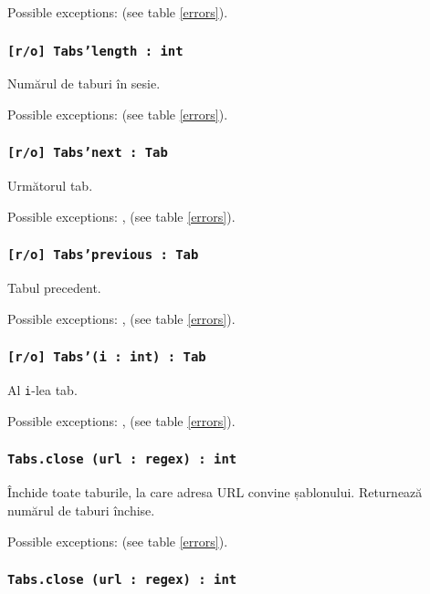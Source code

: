 Possible exceptions:  (see table \ref{errors}).

\subsubsection{\texttt{[r/o] Tabs'length : int}}

Numărul de taburi în sesie.

Possible exceptions:  (see table \ref{errors}).

\subsubsection{\texttt{[r/o] Tabs'next : Tab}}

Următorul tab.

Possible exceptions: ,  (see table \ref{errors}).

\subsubsection{\texttt{[r/o] Tabs'previous : Tab}}

Tabul precedent.

Possible exceptions: ,  (see table \ref{errors}).

\subsubsection{\texttt{[r/o] Tabs'(i : int) : Tab}}

Al \texttt{i}-lea tab.

Possible exceptions: ,  (see table \ref{errors}).

\subsubsection{\texttt{Tabs.close (url : regex) : int}}

Închide toate taburile, la care adresa URL convine șablonului. Returnează numărul de taburi închise.

Possible exceptions:  (see table \ref{errors}).

\subsubsection{\texttt{Tabs.close (url : regex) : int}}

